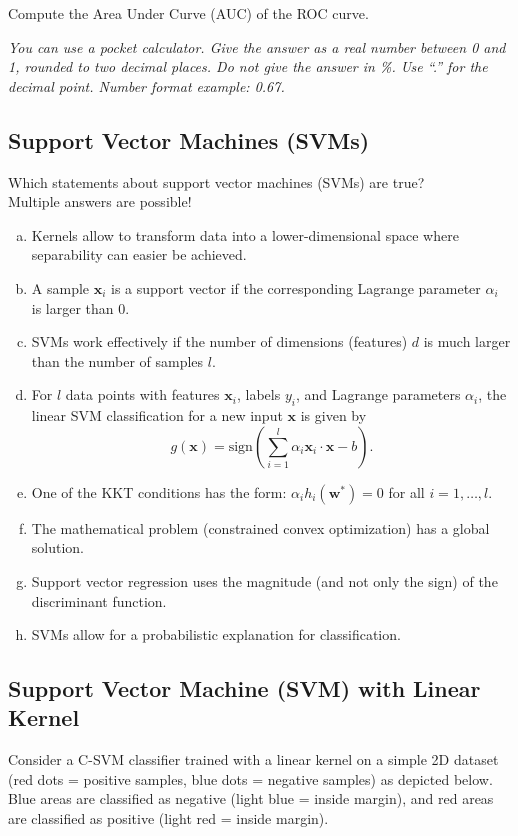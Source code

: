 \documentclass{article}
\begin{document}
Compute the Area Under Curve (AUC) of the ROC curve.

\textit{You can use a pocket calculator. Give the answer as a real number between 0 and 1, rounded to two decimal places. Do not give the answer in \%. Use ``.'' for the decimal point. Number format example: 0.67.}

\subsection*{Support Vector Machines (SVMs)}

Which statements about support vector machines (SVMs) are true? \\
Multiple answers are possible!

\begin{enumerate}[(a)]
    \item Kernels allow to transform data into a lower-dimensional space where separability can easier be achieved.
    \item A sample $\mathbf{x}_i$ is a support vector if the corresponding Lagrange parameter $\alpha_i$ is larger than $0$.
    \item SVMs work effectively if the number of dimensions (features) $d$ is much larger than the number of samples $l$.
    \item For $l$ data points with features $\mathbf{x}_i$, labels $y_i$, and Lagrange parameters $\alpha_i$, the linear SVM classification for a new input $\mathbf{x}$ is given by
          \[
          g(\mathbf{x}) = \text{sign}\left(\sum_{i=1}^l \alpha_i \mathbf{x}_i \cdot \mathbf{x} - b\right).
          \]
    \item One of the KKT conditions has the form: $\alpha_i h_i(\mathbf{w}^*) = 0$ for all $i = 1, \ldots, l$.
    \item The mathematical problem (constrained convex optimization) has a global solution.
    \item Support vector regression uses the magnitude (and not only the sign) of the discriminant function.
    \item SVMs allow for a probabilistic explanation for classification.
\end{enumerate}

\subsection*{Support Vector Machine (SVM) with Linear Kernel}

Consider a C-SVM classifier trained with a linear kernel on a simple 2D dataset (red dots = positive samples, blue dots = negative samples) as depicted below. Blue areas are classified as negative (light blue = inside margin), and red areas are classified as positive (light red = inside margin).
\end{document}
